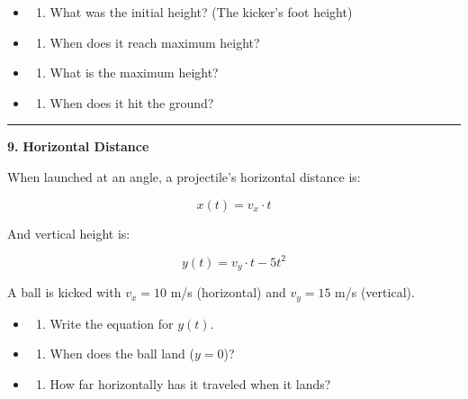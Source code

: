 \documentclass[
  11pt,
]{article}
\providecommand{\tightlist}{%
  \setlength{\itemsep}{0pt}\setlength{\parskip}{0pt}}
\begin{document}
\begin{itemize}
\item
  \begin{enumerate}
  \def\labelenumi{(\alph{enumi})}
  \tightlist
  \item
    What was the initial height? (The kicker's foot height)
  \end{enumerate}
\item
  \begin{enumerate}
  \def\labelenumi{(\alph{enumi})}
  \setcounter{enumi}{1}
  \tightlist
  \item
    When does it reach maximum height?
  \end{enumerate}
\item
  \begin{enumerate}
  \def\labelenumi{(\alph{enumi})}
  \setcounter{enumi}{2}
  \tightlist
  \item
    What is the maximum height?
  \end{enumerate}
\item
  \begin{enumerate}
  \def\labelenumi{(\alph{enumi})}
  \setcounter{enumi}{3}
  \tightlist
  \item
    When does it hit the ground?
  \end{enumerate}
\end{itemize}

\begin{center}\rule{0.5\linewidth}{0.5pt}\end{center}

\textbf{9.} \textbf{Horizontal Distance}

When launched at an angle, a projectile's horizontal distance is:

\[x(t) = v_x \cdot t\]

And vertical height is:

\[y(t) = v_y \cdot t - 5t^2\]

A ball is kicked with \(v_x = 10\) m/s (horizontal) and \(v_y = 15\) m/s
(vertical).

\begin{itemize}
\item
  \begin{enumerate}
  \def\labelenumi{(\alph{enumi})}
  \tightlist
  \item
    Write the equation for \(y(t)\).
  \end{enumerate}
\item
  \begin{enumerate}
  \def\labelenumi{(\alph{enumi})}
  \setcounter{enumi}{1}
  \tightlist
  \item
    When does the ball land (\(y = 0\))?
  \end{enumerate}
\item
  \begin{enumerate}
  \def\labelenumi{(\alph{enumi})}
  \setcounter{enumi}{2}
  \tightlist
  \item
    How far horizontally has it traveled when it lands?
  \end{enumerate}
\end{itemize}
\end{document}

